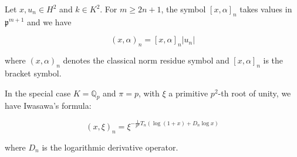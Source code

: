 Let $x, u_n \in H^2$ and $k \in K^2$. For $m \geq 2n + 1$, the symbol $[x, \alpha]_n$ takes values in $\mathfrak{p}^{m+1}$ and we have

$$
(x, \alpha)_n = [x, \alpha]_n |u_n|
$$

where $(x, \alpha)_n$ denotes the classical norm residue symbol and $[x, \alpha]_n$ is the bracket symbol.

In the special case $K = \mathbb{Q}_p$ and $\pi = p$, with $\xi$ a primitive $p^2$-th root of unity, we have Iwasawa's formula:

$$
(x, \xi)_n = \xi^{-\frac{1}{p^n} T_n(\log(1+x) + D_n \log x)}
$$

where $D_n$ is the logarithmic derivative operator.
